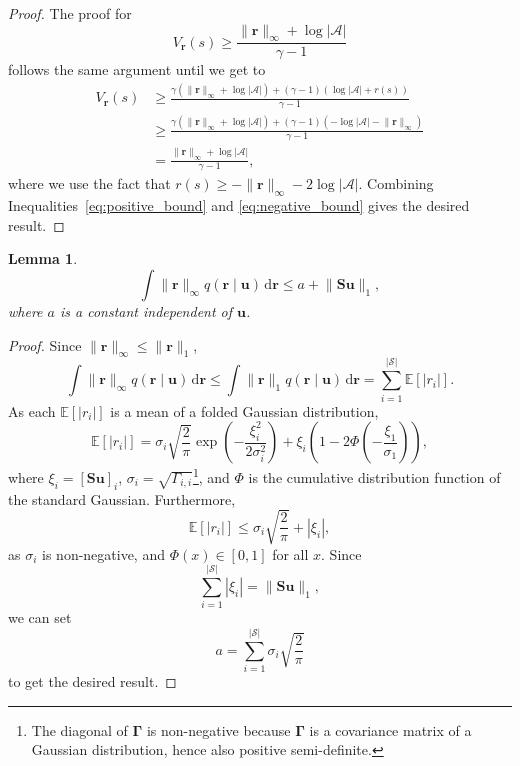 \documentclass{mpaper}
\newtheorem{lemma}[theorem]{Lemma}
\newcommand{\V}{V_{\mathbf{r}}}
\newcommand{\rinf}{\lVert \mathbf{r} \rVert_\infty}
\begin{document}
\begin{proof}
  The proof for
  \begin{equation} \label{eq:negative_bound}
    \V(s) \ge \frac{\rinf + \log|\mathcal{A}|}{\gamma - 1}
  \end{equation}
  follows the same argument until we get to
  \begin{align*}
    \V(s) &\ge \frac{\gamma(\rinf + \log|\mathcal{A}|) + (\gamma - 1)(\log|\mathcal{A}| + r(s))}{\gamma - 1} \\
          &\ge \frac{\gamma(\rinf + \log|\mathcal{A}|) + (\gamma - 1)(-\log|\mathcal{A}| -\rinf)}{\gamma - 1} \\
          &= \frac{\rinf + \log|\mathcal{A}|}{\gamma - 1},
  \end{align*}
  where we use the fact that $r(s) \ge -\rinf - 2\log|\mathcal{A}|$. Combining
  Inequalities~\eqref{eq:positive_bound} and \eqref{eq:negative_bound} gives
  the desired result.
\end{proof}

\begin{lemma} \label{lemma:integral_of_r}
  \[
    \int \lVert \mathbf{r} \rVert_\infty q(\mathbf{r} \mid
    \mathbf{u})\,\mathrm{d}\mathbf{r} \le a + \lVert \mathbf{Su} \rVert_1,
  \]
  where $a$ is a constant independent of $\mathbf{u}$.
\end{lemma}
\begin{proof}
  Since $\rinf \le \lVert \mathbf{r} \rVert_1$,
  \[
    \int \lVert \mathbf{r} \rVert_\infty q(\mathbf{r} \mid
    \mathbf{u})\,\mathrm{d}\mathbf{r} \le \int \lVert \mathbf{r} \rVert_1
    q(\mathbf{r} \mid \mathbf{u})\,\mathrm{d}\mathbf{r} =
    \sum_{i=1}^{|\mathcal{S}|} \mathbb{E}[|r_i|].
  \]
  As each $\mathbb{E}[|r_i|]$ is a mean of a folded Gaussian distribution,
  \[
    \mathbb{E}[|r_i|] = \sigma_i \sqrt{\frac{2}{\pi}} \exp
    \left(-\frac{\xi_i^2}{2\sigma_i^2} \right) + \xi_i \left( 1 - 2\Phi \left(
        -\frac{\xi_1}{\sigma_1} \right) \right),
  \]
  where $\xi_i = \left[\mathbf{Su}\right]_i$, $\sigma_i =
  \sqrt{\Gamma_{i,i}}$\footnote{The diagonal of $\bm\Gamma$ is non-negative
    because $\bm\Gamma$ is a covariance matrix of a Gaussian distribution, hence
    also positive semi-definite.}, and $\Phi$ is the cumulative distribution
  function of the standard Gaussian. Furthermore,
  \[
    \mathbb{E}[|r_i|] \le \sigma_i\sqrt{\frac{2}{\pi}} + |\xi_i|,
  \]
  as $\sigma_i$ is non-negative, and $\Phi(x) \in [0, 1]$ for all $x$. Since
  \[
    \sum_{i=1}^{|\mathcal{S}|} |\xi_i| = \lVert \mathbf{Su} \rVert_1,
  \]
  we can set
  \[ a = \sum_{i=1}^{|\mathcal{S}|} \sigma_i \sqrt{\frac{2}{\pi}} \]
  to get the desired result.
\end{proof}
\end{document}
